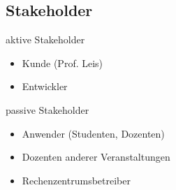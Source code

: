 \subsection{Stakeholder}

\begin{frame}{\insertsectionhead}{\insertsubsectionhead}
  \begin{block}{aktive Stakeholder}
    \begin{itemize}
      \item Kunde (Prof. Leis)
      \item Entwickler
    \end{itemize}
  \end{block}
  \begin{block}{passive Stakeholder}
    \begin{itemize}
      \item Anwender (Studenten, Dozenten)
      \item Dozenten anderer Veranstaltungen
      \item Rechenzentrumsbetreiber
    \end{itemize}
  \end{block}
\end{frame}
